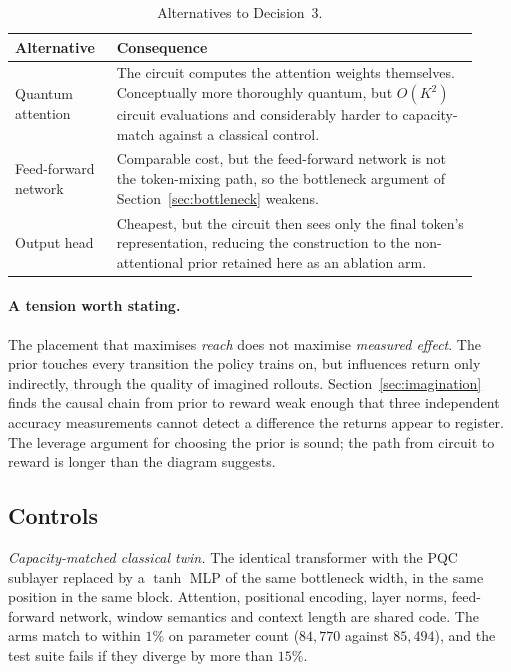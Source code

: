 \documentclass[11pt,onecolumn]{article}
\begin{document}
\begin{table}[htb]\centering\small
\caption{Alternatives to Decision~3.}\label{tab:alt3}
\begin{tabular}{p{0.20\linewidth}p{0.72\linewidth}}
\toprule
Alternative & Consequence \\
\midrule
Quantum attention &
The circuit computes the attention weights themselves. Conceptually more
thoroughly quantum, but $O(K^2)$ circuit evaluations and considerably
harder to capacity-match against a classical control. \\[2pt]
Feed-forward network &
Comparable cost, but the feed-forward network is not the token-mixing
path, so the bottleneck argument of Section~\ref{sec:bottleneck}
weakens. \\[2pt]
Output head &
Cheapest, but the circuit then sees only the final token's
representation, reducing the construction to the non-attentional prior
retained here as an ablation arm. \\
\bottomrule
\end{tabular}
\end{table}

\paragraph{A tension worth stating.}
The placement that maximises \emph{reach} does not maximise
\emph{measured effect}. The prior touches every transition the policy
trains on, but influences return only indirectly, through the quality of
imagined rollouts. Section~\ref{sec:imagination} finds the causal chain
from prior to reward weak enough that three independent accuracy
measurements cannot detect a difference the returns appear to register.
The leverage argument for choosing the prior is sound; the path from
circuit to reward is longer than the diagram suggests.

\subsection{Controls}
\emph{Capacity-matched classical twin.} The identical transformer with
the PQC sublayer replaced by a $\tanh$ MLP of the same bottleneck width,
in the same position in the same block. Attention, positional encoding,
layer norms, feed-forward network, window semantics and context length
are shared code. The arms match to within $1\%$ on parameter count
($84{,}770$ against $85{,}494$), and the test suite fails if they
diverge by more than $15\%$.
\end{document}
